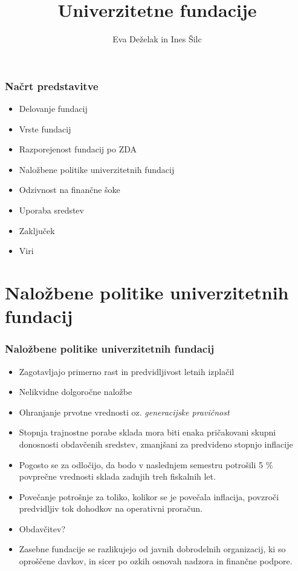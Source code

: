 \documentclass[10pt]{beamer}
\begin{document}
\title[Univerzitetne fundacije]{Univerzitetne fundacije}
\author[Eva Deželak in Ines Šilc]{Eva Deželak in Ines Šilc}


\begin{frame}
	\titlepage
\end {frame}


\begin{frame}
\frametitle{Načrt predstavitve}
\begin{itemize}
\item Delovanje fundacij
\item Vrste fundacij
\item Razporejenost fundacij po ZDA
\item Naložbene politike univerzitetnih fundacij
\item Odzivnost na finančne šoke
\item Uporaba sredstev
\item Zaključek
\item Viri
\end{itemize}
\end{frame}

\section{Naložbene politike univerzitetnih fundacij}
\begin{frame}
\frametitle{Naložbene politike univerzitetnih fundacij}
\begin{itemize}
\item Zagotavljajo primerno rast in predvidljivost letnih izplačil
\item Nelikvidne dolgoročne naložbe
\item Ohranjanje prvotne vrednosti oz. \textit{generacijske pravičnost}
\item Stopnja trajnostne porabe sklada mora biti enaka pričakovani skupni donosnosti obdavčenih sredstev, zmanjšani za predvideno stopnjo inflacije
\item Pogosto se za odločijo, da bodo v naslednjem semestru potrošili 5 \% povprečne vrednosti sklada zadnjih treh fiskalnih let.
\item Povečanje potrošnje za toliko, kolikor se je povečala inflacija, povzroči predvidljiv tok dohodkov na operativni proračun.
\item Obdavčitev?
\item Zasebne fundacije se razlikujejo od javnih dobrodelnih organizacij, ki so oproščene davkov, in sicer po ozkih osnovah nadzora in finančne podpore.
\end{itemize}
\end{frame}
\end{document}
